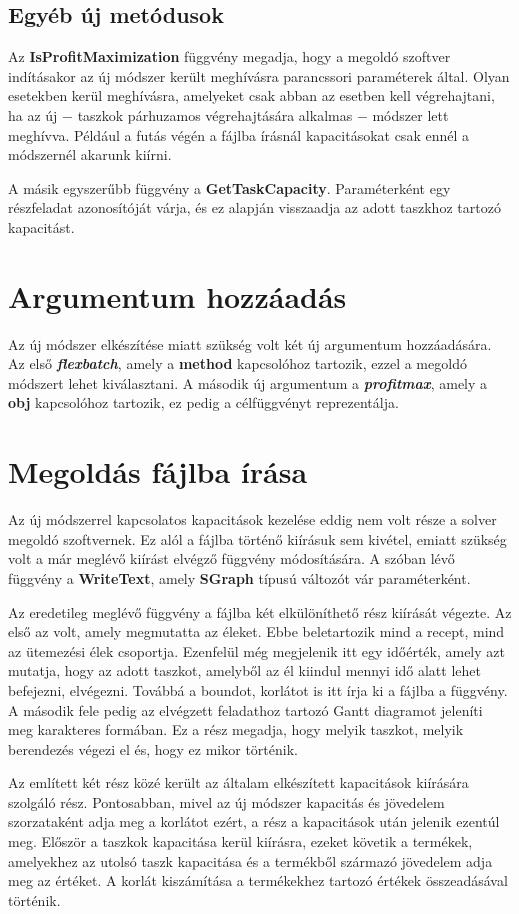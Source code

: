 \subsection{Egyéb új metódusok}
Az \textbf{IsProfitMaximization} függvény megadja, hogy a megoldó szoftver indításakor az új módszer került meghívásra parancssori paraméterek által. Olyan esetekben kerül meghívásra, amelyeket csak abban az esetben kell végrehajtani, ha az új $-$ taszkok párhuzamos végrehajtására alkalmas $-$ módszer lett meghívva. Például a futás végén a fájlba írásnál kapacitásokat csak ennél a módszernél akarunk kiírni.

A másik egyszerűbb függvény a \textbf{GetTaskCapacity}. Paraméterként egy részfeladat azonosítóját várja, és ez alapján visszaadja az adott taszkhoz tartozó kapacitást.

\section{Argumentum hozzáadás}
Az új módszer elkészítése miatt szükség volt két új argumentum hozzáadására. Az első \textbf{\textit{flexbatch}}, amely a \textbf{method} kapcsolóhoz tartozik, ezzel a megoldó módszert lehet kiválasztani. A második új argumentum a \textbf{\textit{profit\textunderscore max}}, amely a \textbf{obj} kapcsolóhoz tartozik, ez pedig a célfüggvényt reprezentálja.

\section{Megoldás fájlba írása}
Az új módszerrel kapcsolatos kapacitások kezelése eddig nem volt része a solver megoldó szoftvernek. Ez alól a fájlba történő kiírásuk sem kivétel, emiatt szükség volt a már meglévő kiírást elvégző függvény módosítására. A szóban lévő függvény a \textbf{WriteText}, amely \textbf{SGraph} típusú változót vár paraméterként.

Az eredetileg meglévő függvény a fájlba két elkülöníthető rész kiírását végezte. Az első az volt, amely megmutatta az éleket. Ebbe beletartozik mind a recept, mind az ütemezési élek csoportja. Ezenfelül még megjelenik itt egy időérték, amely azt mutatja, hogy az adott taszkot, amelyből az él kiindul mennyi idő alatt lehet befejezni, elvégezni. Továbbá a boundot, korlátot is itt írja ki a fájlba a függvény. A második fele pedig az elvégzett feladathoz tartozó Gantt diagramot jeleníti meg karakteres formában. Ez a rész megadja, hogy melyik taszkot, melyik berendezés végezi el és, hogy ez mikor történik.

Az említett két rész közé került az általam elkészített kapacitások kiírására szolgáló rész. Pontosabban, mivel az új módszer kapacitás és jövedelem szorzataként adja meg a korlátot ezért, a rész a kapacitások után jelenik ezentúl meg. Először a taszkok kapacitása kerül kiírásra, ezeket követik a termékek, amelyekhez az utolsó taszk kapacitása és a termékből származó jövedelem adja meg az értéket. A korlát kiszámítása a termékekhez tartozó értékek összeadásával történik.